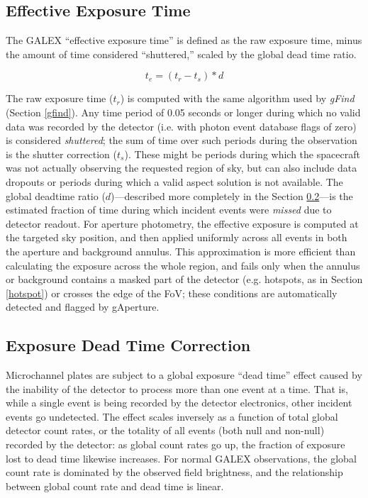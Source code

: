 \documentclass[preprint]{aastex}
\begin{document}
\subsection{Effective Exposure Time}
\label{effexptime}
The GALEX ``effective exposure time'' is defined as the raw exposure time, minus the amount of time considered ``shuttered,'' scaled by the global dead time ratio.

\[t_e=(t_r-t_s)*d\]

The raw exposure time ($t_r$) is computed with the same algorithm used by \emph{gFind} (Section \ref{gfind}). Any time period of 0.05 seconds or longer during which no valid data was recorded by the detector (i.e. with photon event database flags of zero) is considered \emph{shuttered}; the sum of time over such periods during the observation is the shutter correction ($t_s$). These might be periods during which the spacecraft was not actually observing the requested region of sky, but can also include data dropouts or periods during which a valid aspect solution is not available. The global deadtime ratio ($d$)---described more completely in the Section \ref{deadtimedesc}---is the estimated fraction of time during which incident events were \emph{missed} due to detector readout. For aperture photometry, the effective exposure is computed at the targeted sky position, and then applied uniformly across all events in both the aperture and background annulus. This approximation is more efficient than calculating the exposure across the whole region, and fails only when the annulus or background contains a masked part of the detector (e.g. hotspots, as in Section \ref{hotspot}) or crosses the edge of the FoV; these conditions are automatically detected and flagged by gAperture.

\subsection{Exposure Dead Time Correction}
\label{deadtimedesc}
Microchannel plates are subject to a global exposure ``dead time'' effect caused by the inability of the detector to process more than one event at a time. That is, while a single event is being recorded by the detector electronics, other incident events go undetected. The effect scales inversely as a function of total global detector count rates, or the totality of all events (both null and non-null) recorded by the detector: as global count rates go up, the fraction of exposure lost to dead time likewise increases. For normal GALEX observations, the global count rate is dominated by the observed field brightness, and the relationship between global count rate and dead time is linear.
\end{document}
